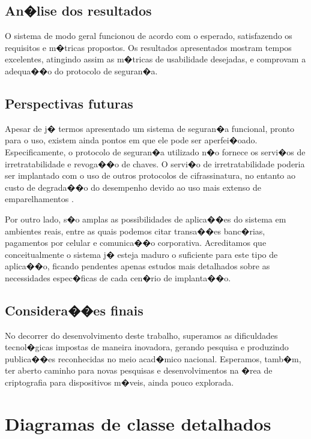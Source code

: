\documentclass[a4paper,capchap,espacoduplo,normaltoc]{abntepusp}
\begin{document}
\section{An�lise dos resultados}
O sistema de modo geral funcionou de acordo com o esperado, satisfazendo os requisitos e m�tricas propostos. Os resultados apresentados mostram tempos excelentes, atingindo assim as m�tricas de usabilidade desejadas, e comprovam a adequa��o do protocolo de seguran�a.

\section{Perspectivas futuras}
Apesar de j� termos apresentado um sistema de seguran�a funcional, pronto para o uso, existem ainda pontos em que ele pode ser aperfei�oado. Especificamente, o protocolo de seguran�a utilizado n�o fornece os servi�os de irretratabilidade e revoga��o de chaves. O servi�o de irretratabilidade poderia ser implantado com o uso de outros protocolos de cifrassinatura, no entanto ao custo de degrada��o do desempenho devido ao uso mais extenso de emparelhamentos \cite[section~3]{bdcps}.

Por outro lado, s�o amplas as possibilidades de aplica��es do sistema em ambientes reais, entre as quais podemos citar transa��es banc�rias, pagamentos por celular e comunica��o corporativa. Acreditamos que conceitualmente o sistema j� esteja maduro o suficiente para este tipo de aplica��o, ficando pendentes apenas estudos mais detalhados sobre as necessidades espec�ficas de cada cen�rio de implanta��o.

\section{Considera��es finais}
No decorrer do desenvolvimento deste trabalho, superamos as dificuldades tecnol�gicas impostas de maneira inovadora, gerando pesquisa e produzindo publica��es \cite{ssms, bdcps} reconhecidas no meio acad�mico nacional. Esperamos, tamb�m, ter aberto caminho para novas pesquisas e desenvolvimentos na �rea de criptografia para dispositivos m�veis, ainda pouco explorada.



\appendix

\chapter{Diagramas de classe detalhados}\label{app:classe_detalhados}
\end{document}
